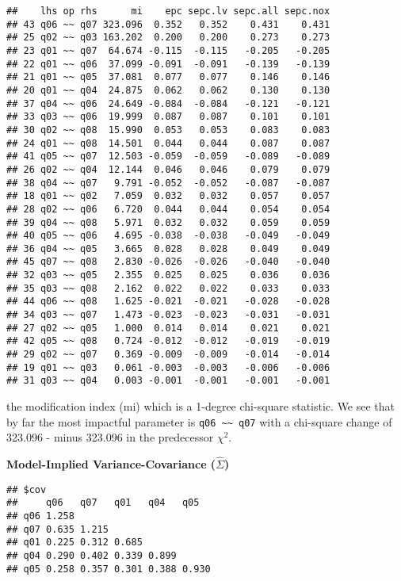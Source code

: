 \documentclass[
]{article}
\newenvironment{Shaded}{\begin{snugshade}}{\end{snugshade}}
\newcommand{\FunctionTok}[1]{\textcolor[rgb]{0.00,0.00,0.00}{#1}}
\newcommand{\NormalTok}[1]{#1}
\newcommand{\SpecialCharTok}[1]{\textcolor[rgb]{0.00,0.00,0.00}{#1}}
\begin{document}
\begin{verbatim}
##    lhs op rhs      mi    epc sepc.lv sepc.all sepc.nox
## 43 q06 ~~ q07 323.096  0.352   0.352    0.431    0.431
## 25 q02 ~~ q03 163.202  0.200   0.200    0.273    0.273
## 23 q01 ~~ q07  64.674 -0.115  -0.115   -0.205   -0.205
## 22 q01 ~~ q06  37.099 -0.091  -0.091   -0.139   -0.139
## 21 q01 ~~ q05  37.081  0.077   0.077    0.146    0.146
## 20 q01 ~~ q04  24.875  0.062   0.062    0.130    0.130
## 37 q04 ~~ q06  24.649 -0.084  -0.084   -0.121   -0.121
## 33 q03 ~~ q06  19.999  0.087   0.087    0.101    0.101
## 30 q02 ~~ q08  15.990  0.053   0.053    0.083    0.083
## 24 q01 ~~ q08  14.501  0.044   0.044    0.087    0.087
## 41 q05 ~~ q07  12.503 -0.059  -0.059   -0.089   -0.089
## 26 q02 ~~ q04  12.144  0.046   0.046    0.079    0.079
## 38 q04 ~~ q07   9.791 -0.052  -0.052   -0.087   -0.087
## 18 q01 ~~ q02   7.059  0.032   0.032    0.057    0.057
## 28 q02 ~~ q06   6.720  0.044   0.044    0.054    0.054
## 39 q04 ~~ q08   5.971  0.032   0.032    0.059    0.059
## 40 q05 ~~ q06   4.695 -0.038  -0.038   -0.049   -0.049
## 36 q04 ~~ q05   3.665  0.028   0.028    0.049    0.049
## 45 q07 ~~ q08   2.830 -0.026  -0.026   -0.040   -0.040
## 32 q03 ~~ q05   2.355  0.025   0.025    0.036    0.036
## 35 q03 ~~ q08   2.162  0.022   0.022    0.033    0.033
## 44 q06 ~~ q08   1.625 -0.021  -0.021   -0.028   -0.028
## 34 q03 ~~ q07   1.473 -0.023  -0.023   -0.031   -0.031
## 27 q02 ~~ q05   1.000  0.014   0.014    0.021    0.021
## 42 q05 ~~ q08   0.724 -0.012  -0.012   -0.019   -0.019
## 29 q02 ~~ q07   0.369 -0.009  -0.009   -0.014   -0.014
## 19 q01 ~~ q03   0.061 -0.003  -0.003   -0.006   -0.006
## 31 q03 ~~ q04   0.003 -0.001  -0.001   -0.001   -0.001
\end{verbatim}

the modification index (mi) which is a 1-degree chi-square statistic. We
see that by far the most impactful parameter is
\texttt{q06\ \textasciitilde{}\textasciitilde{}\ q07} with a chi-square
change of 323.096 - minus 323.096 in the predecessor \(\chi^{2}\).

\textbf{Model-Implied Variance-Covariance (\(\hat{\Sigma}\))}

\begin{Shaded}
\end{Shaded}

\begin{verbatim}
## $cov
##     q06   q07   q01   q04   q05  
## q06 1.258                        
## q07 0.635 1.215                  
## q01 0.225 0.312 0.685            
## q04 0.290 0.402 0.339 0.899      
## q05 0.258 0.357 0.301 0.388 0.930
\end{verbatim}
\end{document}

